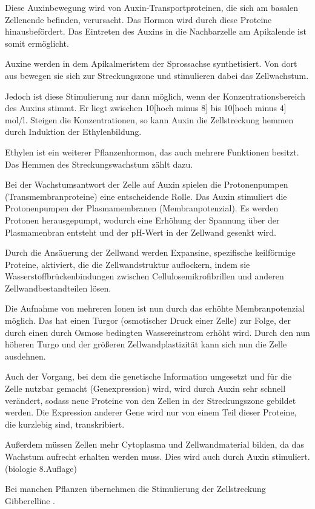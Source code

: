 \documentclass[
a4paper, 
11pt, 
ngerman,
listof=totoc,
bibliography=totocnumbered,
abstracton
]{scrreprt}
\begin{document}
Diese Auxinbewegung wird von Auxin-Transportproteinen, die sich am basalen Zellenende befinden, verursacht.
Das Hormon wird durch diese Proteine hinausbefördert. Das Eintreten des Auxins in die Nachbarzelle am Apikalende ist somit ermöglicht.

Auxine werden in dem Apikalmeristem der Sprossachse synthetisiert. Von dort aus bewegen sie sich zur Streckungszone und stimulieren dabei das Zellwachstum.

Jedoch ist diese Stimulierung nur dann möglich, wenn der Konzentrationsbereich des Auxins stimmt. Er liegt zwischen 10[hoch minus 8] bis 10[hoch minus 4] mol/l. Steigen die Konzentrationen, so kann Auxin die Zellstreckung hemmen durch Induktion der Ethylenbildung.

Ethylen ist ein weiterer Pflanzenhormon, das auch mehrere Funktionen besitzt. Das Hemmen des Streckungswachstum zählt dazu. 

Bei der Wachstumsantwort der Zelle auf Auxin spielen die Protonenpumpen (Transmembranproteine) eine entscheidende Rolle. Das Auxin stimuliert die Protonenpumpen der Plasmamembranen (Membranpotenzial). Es werden Protonen herausgepumpt, wodurch eine Erhöhung der Spannung über der Plasmamenbran entsteht und der pH-Wert in der Zellwand gesenkt wird. 

Durch die Ansäuerung  der Zellwand werden Expansine, spezifische keilförmige Proteine, aktiviert, die die Zellwandstruktur auflockern, indem sie Wasserstoffbrückenbindungen zwischen Cellulosemikrofibrillen und anderen Zellwandbestandteilen lösen. 

Die Aufnahme von mehreren Ionen ist nun durch das erhöhte Membranpotenzial möglich. Das hat einen Turgor (osmotischer Druck einer Zelle) zur Folge, der durch einen durch Osmose bedingten Wassereinstrom erhöht wird. Durch den nun höheren Turgo und der größeren Zellwandplastizität kann sich nun die Zelle ausdehnen.

Auch der Vorgang, bei dem die genetische Information umgesetzt  und für die Zelle nutzbar gemacht (Genexpression) wird, wird durch Auxin sehr schnell verändert, sodass neue Proteine von den Zellen in der Streckungszone gebildet werden.
Die Expression anderer Gene wird nur von einem Teil dieser Proteine, die kurzlebig sind, transkribiert. 

Außerdem müssen Zellen mehr Cytoplasma und Zellwandmaterial bilden, da das Wachstum aufrecht erhalten werden muss. Dies wird auch durch Auxin stimuliert. (biologie 8.Auflage)


Bei manchen Pflanzen übernehmen die Stimulierung der Zellstreckung Gibberelline \parencite[502f]{Nultsch}. 
\end{document}
